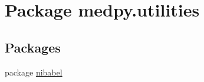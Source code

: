 \hypertarget{namespacemedpy_1_1utilities}{
\section{Package medpy.utilities}
\label{namespacemedpy_1_1utilities}
}
\subsection*{Packages}
\begin{DoxyCompactItemize}
\item 
package \hyperlink{namespacemedpy_1_1utilities_1_1nibabel}{nibabel}
\end{DoxyCompactItemize}
